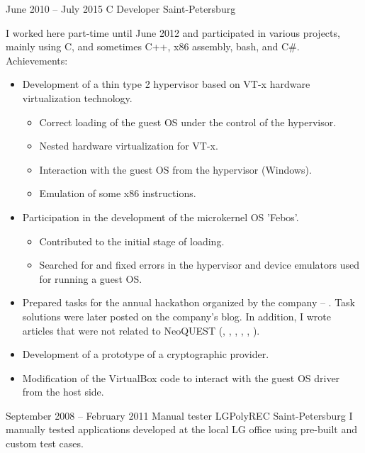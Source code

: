 \documentclass[11pt,a4paper,sans]{moderncv}
\begin{document}
\cventry
{June 2010 -- July 2015}
{C Developer}
{}
{Saint-Petersburg}
{}
{I worked here part-time until June 2012 and participated in various projects, mainly using C, and sometimes C++, x86 assembly, bash, and C\#.\newline{}
Achievements:
\begin{itemize}
\item Development of a thin type 2 hypervisor based on VT-x hardware virtualization technology.
  \begin{itemize}
  \item Correct loading of the guest OS under the control of the hypervisor.
  \item Nested hardware virtualization for VT-x.
  \item Interaction with the guest OS from the hypervisor (Windows).
  \item Emulation of some x86 instructions.
  \end{itemize}
\item Participation in the development of the microkernel OS ’Febos’.
  \begin{itemize}
  \item Contributed to the initial stage of loading.
  \item Searched for and fixed errors in the hypervisor and device emulators used for running a guest OS.
  \end{itemize}
\item Prepared tasks for the annual hackathon organized by the company – . Task solutions were later posted on the company’s blog. In addition, I wrote articles that were not related to NeoQUEST (,
								,
								,
								,
								,
								).
\item Development of a prototype of a  cryptographic provider.
\item Modification of the VirtualBox code to interact with the guest OS driver from the host side.
\end{itemize}}

\cventry
{September 2008 -- February 2011}
{Manual tester}
{LGPolyREC}
{Saint-Petersburg}
{}
{I manually tested applications developed at the local LG office using pre-built and custom test cases.}
\end{document}
